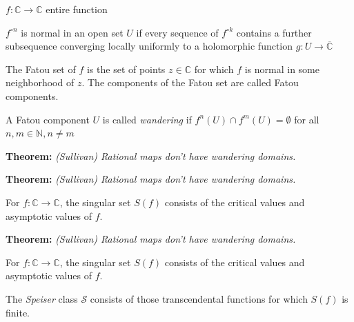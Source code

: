 \documentclass{beamer}
\begin{document}
\begin{frame}

$f: \mathbb{C} \rightarrow \mathbb{C}$ entire function

\vspace{2.5mm}

$f^{\circ n}$ is normal in an open set $U$ if every sequence of $f^{\circ k}$ contains a further subsequence converging locally uniformly to a holomorphic function $g: U \rightarrow \overline{\mathbb{C}}$

\vspace{2.5mm}

The Fatou set of $f$ is the set of points $z \in \mathbb{C}$ for which $f$ is normal in some neighborhood of $z$. The components of the Fatou set are called Fatou components.

\vspace{2.5mm} 

A Fatou component $U$ is called {\it wandering} if $f^n(U) \cap f^m(U) = \emptyset$ for all $n,m \in \mathbb{N}, n \not = m$

\end{frame}





\begin{frame}

{\bf Theorem:} {\it (Sullivan) Rational maps don't have wandering domains.}

\end{frame}


\begin{frame}

{\bf Theorem:} {\it (Sullivan) Rational maps don't have wandering domains.}

\vspace{2.5mm} 

For $f: \mathbb{C} \rightarrow \mathbb{C}$, the singular set $S(f)$ consists of the critical values and asymptotic values of $f$.

\vspace{2.5mm}

\end{frame}


\begin{frame}

{\bf Theorem:} {\it (Sullivan) Rational maps don't have wandering domains.}

\vspace{2.5mm} 

For $f: \mathbb{C} \rightarrow \mathbb{C}$, the singular set $S(f)$ consists of the critical values and asymptotic values of $f$.

\vspace{2.5mm}

The {\it Speiser} class $\mathcal{S}$ consists of those transcendental functions for which $S(f)$ is finite. 

\end{frame}
\end{document}
